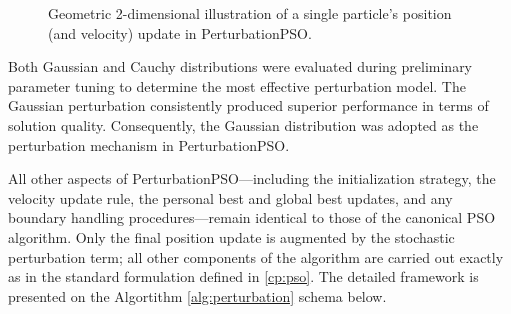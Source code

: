 {\begin{figure}[H]
    \caption[Geometric illustration of PerturbationPSO's position (and velocity) update]{Geometric 2-dimensional illustration of a single particle's position (and velocity) update in PerturbationPSO.}
    \label{fig:PerturbationPSO_geometric_illustration}
\end{figure}


Both Gaussian and Cauchy distributions were evaluated during preliminary parameter tuning to determine the most effective perturbation model. The Gaussian perturbation consistently produced superior performance in terms of solution quality. Consequently, the Gaussian distribution was adopted as the perturbation mechanism in PerturbationPSO.

All other aspects of PerturbationPSO—including the initialization strategy, the velocity update rule, the personal best and global best updates, and any boundary handling pro\-ce\-dures---remain identical to those of the canonical PSO algorithm. Only the final position update is augmented by the stochastic perturbation term; all other components of the algorithm are carried out exactly as in the standard formulation defined in \autoref{cp:pso}. The  detailed framework is presented on the Algortithm \ref{alg:perturbation} schema below.

\vspace{.835em}

}

